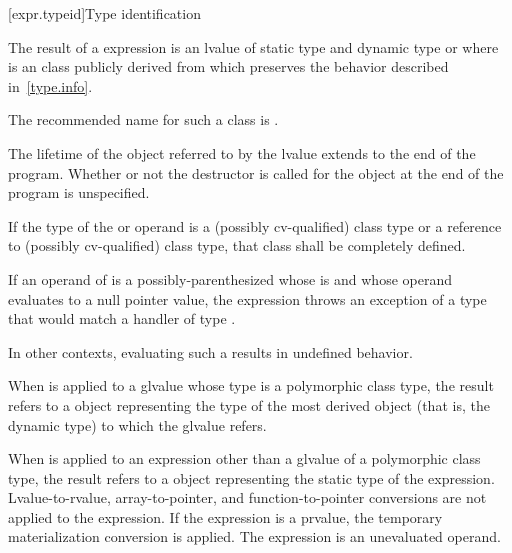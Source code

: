[expr.typeid]{Type identification}

\pnum
{}%
%
The result of a  expression is an lvalue of static type
%
%
  and dynamic type 
 or   where  is an
 class publicly derived from
 which preserves the behavior described
in~\ref{type.info}.
\begin{footnote}
The recommended name for such a class is
.
\end{footnote}
The lifetime of the object referred to by the lvalue extends to the end
of the program. Whether or not the destructor is called for the
 object at the end of the program is unspecified.

\pnum
If the type of the  or  operand is
a (possibly cv-qualified) class type or
a reference to (possibly cv-qualified) class type,
that class shall be completely defined.

\pnum
If an  operand of  is
a possibly-parenthesized 
whose  is \tcode{*} and
whose operand evaluates to a null pointer value,
the  expression throws an exception
of a type that would match a handler of type
%
%
.
\begin{note}
In other contexts, evaluating such a 
results in undefined behavior.
\end{note}

\pnum
When  is applied to a glvalue whose type is a
polymorphic class type, the result refers to a
 object representing the type of the most derived
object (that is, the dynamic type) to which the
glvalue refers.

\pnum
When  is applied to an expression other than a glvalue of
a polymorphic class type, the result refers to a 
object representing the static type of the expression.
Lvalue-to-rvalue, array-to-pointer,
and function-to-pointer conversions are not applied to
the expression.
If the expression is a prvalue,
the temporary materialization conversion
is applied.
The expression is an unevaluated operand.


